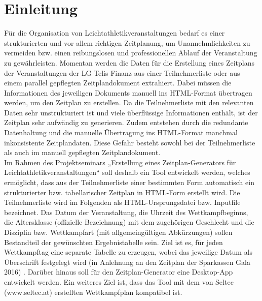 
\chapter{Einleitung}
\label{chap:Einleitung}

Für die Organisation von Leichtathletikveranstaltungen bedarf es einer strukturierten und vor allem richtigen Zeitplanung, um Unannehmlichkeiten zu vermeiden bzw. einen reibungslosen und professionellen Ablauf der Veranstaltung zu gewährleisten. Momentan werden die Daten für die Erstellung eines Zeitplans der Veranstaltungen der LG Telis Finanz aus einer Teilnehmerliste oder aus einem parallel gepflegten Zeitplandokument extrahiert. Dabei müssen die Informationen des jeweiligen Dokuments manuell ins \ac{HTML}-Format übertragen werden, um den Zeitplan zu erstellen. Da die Teilnehmerliste mit den relevanten Daten sehr unstrukturiert ist und viele überflüssige Informationen enthält, ist der Zeitplan sehr aufwändig zu generieren. Zudem entstehen durch die redundante Datenhaltung und die manuelle Übertragung ins HTML-Format manchmal inkonsistente Zeitplandaten. Diese Gefahr besteht sowohl bei der Teilnehmerliste als auch im manuell gepflegten Zeitplandokument. \\
Im Rahmen des Projektseminars „Erstellung eines Zeitplan-Generators für Leichtathletikveranstaltungen“ soll deshalb ein Tool entwickelt werden, welches ermöglicht, dass aus der Teilnehmerliste einer bestimmten Form automatisch ein strukturierter bzw. tabellarischer Zeitplan in HTML-Form erstellt wird. Die Teilnehmerliste wird im Folgenden als \ac{HTML}-Ursprungsdatei bzw. Inputfile bezeichnet. Das Datum der Veranstaltung, die Uhrzeit des Wettkampfbeginns, die Altersklasse (offizielle Bezeichnung) mit dem zugehörigen Geschlecht und die Disziplin bzw. Wettkampfart (mit allgemeingültigen Abkürzungen) sollen Bestandteil der gewünschten Ergebnistabelle sein. Ziel ist es, für jeden Wettkampftag eine separate Tabelle zu erzeugen, wobei das jeweilige Datum als Überschrift festgelegt wird (in Anlehnung an den Zeitplan der Sparkassen Gala 2016) \cite{gala}.
Darüber hinaus soll für den Zeitplan-Generator eine Desktop-App entwickelt werden. Ein weiteres Ziel ist, dass das Tool mit dem von Seltec (www.seltec.at) erstellten Wettkampfplan kompatibel ist.\\
